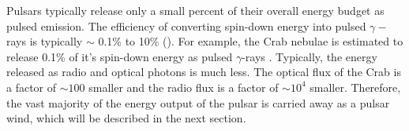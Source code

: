 Pulsars typically release only a small percent of their overall
energy budget as pulsed emission. The efficiency of converting
spin-down energy into pulsed $\gamma-$rays is typically $\sim$
0.1\% to 10\% (\cite{abdo_2010a_first-fermi}).  For example, the
Crab nebulae is estimated to release 0.1\% of it's spin-down energy
as pulsed $\gamma$-rays \cite{abdo_2010a_fermi-large}.  Typically,
the energy released as radio and optical photons is much less.
The optical flux of the Crab is a factor of $\sim100$ smaller
\cite{cocke_1969_discovery-optical} and the radio flux is a factor of
$\sim 10^4$ smaller.  
Therefore, the vast majority of the energy output of
the pulsar is carried away as a pulsar wind, which will 
be described in the next section.

